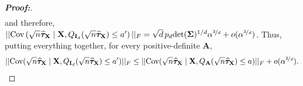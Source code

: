 \documentclass[11pt,twoside]{article}
\theoremstyle{definition}
\theoremstyle{remark}
\begin{document}
\begin{proof}[\textbf{Proof:}]
\begin{align*}
\end{align*}
and therefore, $||\text{Cov}\left(\sqrt{n}\widehat{\bm{\tau}}_{\mathbf{X}} \mid \mathbf{X}, Q_{\mathbf{I}_d}(\sqrt{n} \widehat{\bm{\tau}}_{\mathbf{X}}) \leq a^\prime\right)||_F = \sqrt{d}\, p_d \text{det}(\mathbf{\Sigma})^{1/d} \alpha^{\nicefrac{2}{d}} + o(\alpha^{\nicefrac{2}{d}})$. Thus, putting everything together, for every positive-definite $\mathbf{A}$,
    \begin{align*}
        ||\text{Cov}(\sqrt{n} \widehat{\bm{\tau}}_{\mathbf{X}} \mid \mathbf{X}, Q_{\mathbf{I}_d}(\sqrt{n} \widehat{\bm{\tau}}_{\mathbf{X}}) \leq a^\prime)||_{F} \leq ||\text{Cov}(\sqrt{n} \widehat{\bm{\tau}}_{\mathbf{X}} \mid \mathbf{X}, Q_{\mathbf{A}}(\sqrt{n} \widehat{\bm{\tau}}_{\mathbf{X}}) \leq a)||_{F} + o(\alpha^{\nicefrac{2}{d}}).
    \end{align*}



\end{proof}
\end{document}
